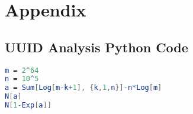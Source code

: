 
\appendix
\section{Appendix} %
\label{sec:appendix}

\subsection{UUID Analysis Python Code} %
\label{sub:uuid_analysis_python_code}
\begin{lstlisting}[language=Mathematica]
m = 2^64
n = 10^5
a = Sum[Log[m-k+1], {k,1,n}]-n*Log[m]
N[a]
N[1-Exp[a]]
\end{lstlisting}


